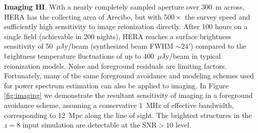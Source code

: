\documentclass[preprint]{aastex}
\newcommand{\compress}{\vspace{-0.3in}}
\begin{document}
{\bf Imaging HI}. With a nearly completely sampled aperture over 300~m across, HERA has the collecting area of Arecibo, but
with $500\times$ the survey speed and sufficiently high sensitivity to image reionization directly.  After 100 hours on a
single field (achievable in 200 nights), HERA reaches a surface brightness sensitivity
of 50~$\mu$Jy/beam (synthesized beam FWHM $\sim 24'$) compared to the brightness temperature fluctuations of up to 400~$\mu$Jy/beam in typical reionization models.
Noise and foreground residuals are limiting factors.  Fortunately, many of the same foreground avoidance and modeling schemes used for power spectrum estimation can also be applied to imaging.  In Figure \ref{fig:imaging} we demonstrate the
resultant sensitivity of imaging in a foreground avoidance scheme, assuming a conservative 1~MHz of effective bandwidth, corresponding to 12~Mpc along the line of
sight.  The brightest structures in the $z=8$ input simulation are detectable at the SNR$>10$ level.

\end{document}
